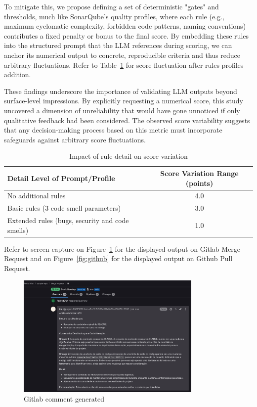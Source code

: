 \documentclass[12pt]{article}
\begin{document}
To mitigate this, we propose defining a set of deterministic "gates" and thresholds, much like SonarQube's quality profiles, where each rule (e.g., maximum cyclomatic complexity, forbidden code patterns, naming conventions) contributes a fixed penalty or bonus to the final score. By embedding these rules into the structured prompt that the LLM references during scoring, we can anchor its numerical output to concrete, reproducible criteria and thus reduce arbitrary fluctuations. Refer to Table~\ref{tab:score_variation} for score fluctuation after rules profiles addition. 

These findings underscore the importance of validating LLM outputs beyond surface-level impressions. By explicitly requesting a numerical score, this study uncovered a dimension of unreliability that would have gone unnoticed if only qualitative feedback had been considered. The observed score variability suggests that any decision-making process based on this metric must incorporate safeguards against arbitrary score fluctuations.

\begin{table}[h!]
  \centering
  \begin{tabular}{|l|c|}
    \hline
    \textbf{Detail Level of Prompt/Profile} & \textbf{Score Variation Range (points)} \\ \hline
    No additional rules                     & 4.0                                  \\ \hline
    Basic rules (3 code smell parameters)              & 3.0                                  \\ \hline
    Extended rules (bugs, security and code smells)       & 1.0                                  \\ \hline
  \end{tabular}
  \caption{Impact of rule detail on score variation}
  \label{tab:score_variation}
\end{table}

Refer to screen capture on Figure~\ref{fig:gitlab} for the displayed output on Gitlab Merge Request and on Figure~\ref{fig:github} for the displayed output on Github Pull Request.

\begin{figure}[ht]
    \centering
    \includegraphics[width=0.8\textwidth]{gitlab.png}
    \caption{Gitlab comment generated}
    \label{fig:gitlab}
\end{figure}
\end{document}
